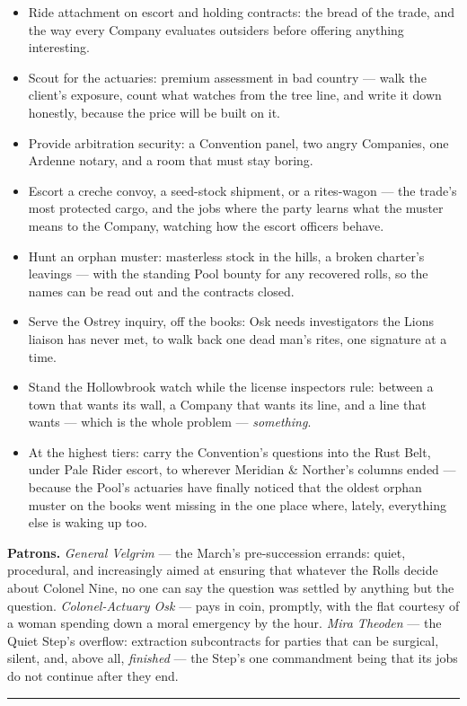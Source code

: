 \begin{itemize}
    \item Ride attachment on escort and holding contracts: the bread of the trade, and the way every Company evaluates outsiders before offering anything interesting.
    \item Scout for the actuaries: premium assessment in bad country --- walk the client's exposure, count what watches from the tree line, and write it down honestly, because the price will be built on it.
    \item Provide arbitration security: a Convention panel, two angry Companies, one Ardenne notary, and a room that must stay boring.
    \item Escort a creche convoy, a seed-stock shipment, or a rites-wagon --- the trade's most protected cargo, and the jobs where the party learns what the muster means to the Company, watching how the escort officers behave.
    \item Hunt an orphan muster: masterless stock in the hills, a broken charter's leavings --- with the standing Pool bounty for any recovered rolls, so the names can be read out and the contracts closed.
    \item Serve the Ostrey inquiry, off the books: Osk needs investigators the Lions liaison has never met, to walk back one dead man's rites, one signature at a time.
    \item Stand the Hollowbrook watch while the license inspectors rule: between a town that wants its wall, a Company that wants its line, and a line that wants --- which is the whole problem --- \textit{something}.
    \item At the highest tiers: carry the Convention's questions into the Rust Belt, under Pale Rider escort, to wherever Meridian \& Norther's columns ended --- because the Pool's actuaries have finally noticed that the oldest orphan muster on the books went missing in the one place where, lately, everything else is waking up too.
\end{itemize}

\textbf{Patrons.} \textit{General Velgrim} --- the March's pre-succession errands: quiet, procedural, and increasingly aimed at ensuring that whatever the Rolls decide about Colonel Nine, no one can say the question was settled by anything but the question. \textit{Colonel-Actuary Osk} --- pays in coin, promptly, with the flat courtesy of a woman spending down a moral emergency by the hour. \textit{Mira Theoden} --- the Quiet Step's overflow: extraction subcontracts for parties that can be surgical, silent, and, above all, \textit{finished} --- the Step's one commandment being that its jobs do not continue after they end.

\medskip\hrule\medskip
